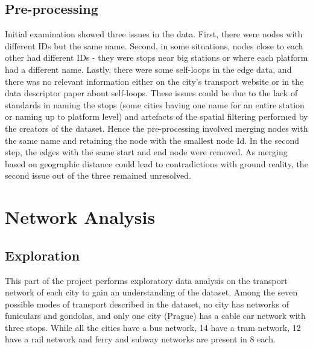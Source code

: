 \documentclass{article}
\theoremstyle{plain}
\theoremstyle{definition}
\theoremstyle{remark}
\begin{document}
\subsection{Pre-processing}
Initial examination showed three issues in the data. First, there were nodes with different IDs but the same name. Second, in some situations, nodes close to each other had different IDs - they were stops near big stations or where each platform had a different name. Lastly, there were some self-loops in the edge data, and there was no relevant information either on the city's transport website or in the data descriptor paper about self-loops. These issues could be due to the lack of standards in naming the stops (some cities having one name for an entire station or naming up to platform level) and artefacts of the spatial filtering performed by the creators of the dataset. Hence the pre-processing involved merging nodes with the same name and retaining the node with the smallest node Id. In the second step, the edges with the same start and end node were removed. As merging based on geographic distance could lead to contradictions with ground reality, the second issue out of the three remained unresolved.

\section{Network Analysis}
\label{analysis}

\subsection{Exploration}
\label{exploration}

This part of the project performs exploratory data analysis on the transport network of each city to gain an understanding of the dataset. Among the seven possible modes of transport described in the dataset, no city has networks of funiculars and gondolas, and only one city (Prague) has a cable car network with three stops. While all the cities have a bus network, 14 have a tram network, 12 have a rail network and ferry and subway networks are present in 8 each.
\end{document}
